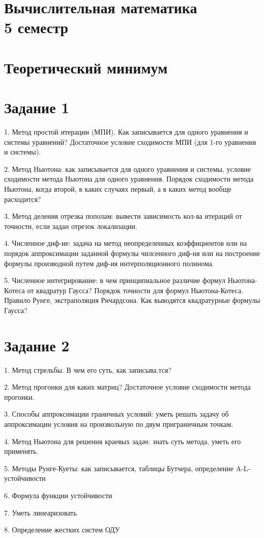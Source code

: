 \documentclass[11pt]{article}
\begin{document}
\section*{Вычислительная математика\\5 семестр\\}
\section*{Теоретический минимум }
\section*{Задание 1}
\hspace{17pt}1. Метод простой итерации (МПИ). Как записывается для одного уравнения и системы уравнений? Достаточное условие сходимости МПИ (для 1-го уравнения и системы).

2. Метод Ньютона: как записывается для одного уравнения и системы, условие сходимости метода Ньютона для одного уравнения. Порядок сходимости метода Ньютона, когда второй, в каких случаях первый, а в каких метод вообще расходится?

3. Метод деления отрезка пополам: вывести зависимость кол-ва итераций от точности, если задан отрезок локализации.

4. Численное диф-ие: задача на метод неопределенных коэффициентов или на порядок аппроксимации заданной формулы чилсенного диф-ия или на построение формулы производной путем диф-ия интерполяционного полинома.

5. Численное интегрирование: в чем принципиальное различие формул Ньютона-Котеса от квадратур Гаусса? Порядок точности для формул Ньютона-Котеса. Правило Рунге, экстраполяция Ричардсона. Как выводятся квадратурные формулы Гаусса?

\section*{Задание 2}

\hspace{17pt}1. Метод стрельбы. В чем его суть, как записыва.тся?

2. Метод прогонки для каких матриц? Достаточное условие сходимости метода прогонки.

3. Способы аппроксимации граничных условий: уметь решать задачу об аппроксимации условия на произвольную по двум приграничным точкам.

4. Метод Ньютона для решения краевых задач: знать суть метода, уметь его применять.

5. Методы Рунге-Куеты: как записывается, таблицы Бутчера, определение A-L-устойчивости

6. Формула функции устойчивости

7. Уметь линеаризовать

8. Определение жестких систем ОДУ
\end{document}
